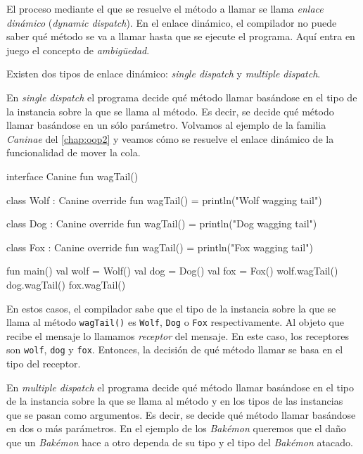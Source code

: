   El proceso mediante el que se resuelve el método a llamar se llama \textit{enlace dinámico} 
  (\textit{dynamic dispatch}).
  En el enlace dinámico, el compilador no puede saber qué método se va a llamar hasta que se ejecute
  el programa.
  Aquí entra en juego el concepto de \textit{ambigüedad}.
  
  Existen dos tipos de enlace dinámico: \textit{single dispatch} y \textit{multiple dispatch}.
  
  En \textit{single dispatch} el programa decide qué método llamar basándose en el tipo de la
  instancia sobre la que se llama al método.
  Es decir, se decide qué método llamar basándose en un sólo parámetro.
  Volvamos al ejemplo de la familia \textit{Caninae} del \cref{chap:oop2} y veamos cómo se resuelve
  el enlace dinámico de la funcionalidad de mover la cola.

  \begin{kotlin}
    interface Canine {
      fun wagTail()
    }
  \end{kotlin}

  \begin{kotlin}
    class Wolf : Canine {
      override fun wagTail() = println("Wolf wagging tail")
    }
  \end{kotlin}

  \begin{kotlin}
    class Dog : Canine {
      override fun wagTail() = println("Dog wagging tail")
    }
  \end{kotlin}

  \begin{kotlin}
    class Fox : Canine {
      override fun wagTail() = println("Fox wagging tail")
    }
  \end{kotlin}

  \begin{kotlin}
    fun main() {
      val wolf = Wolf()
      val dog = Dog()
      val fox = Fox()
      wolf.wagTail()
      dog.wagTail()
      fox.wagTail()
    }
  \end{kotlin}

  En estos casos, el compilador sabe que el tipo de la instancia sobre la que se llama al método
  \texttt{wagTail()} es \texttt{Wolf}, \texttt{Dog} o \texttt{Fox} respectivamente.
  Al objeto que recibe el mensaje lo llamamos \textit{receptor} del mensaje.
  En este caso, los receptores son \texttt{wolf}, \texttt{dog} y \texttt{fox}.
  Entonces, la decisión de qué método llamar se basa en el tipo del receptor.

  En \textit{multiple dispatch} el programa decide qué método llamar basándose en el tipo de la
  instancia sobre la que se llama al método y en los tipos de las instancias que se pasan como
  argumentos.
  Es decir, se decide qué método llamar basándose en dos o más parámetros.
  En el ejemplo de los \textit{Bakémon} queremos que el daño que un \textit{Bakémon} hace a otro
  dependa de su tipo y el tipo del \textit{Bakémon} atacado.
  
